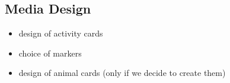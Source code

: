 \subsection{Media Design}

\begin{itemize}
    \item design of activity cards
    \item choice of markers
    \item design of animal cards (only if we decide to create them)
\end{itemize}
